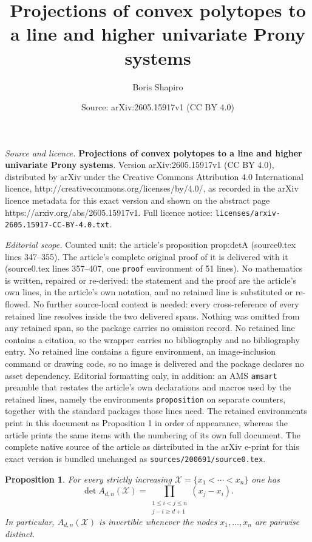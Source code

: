\documentclass[10pt,a4paper]{amsart}
\title{\textbf{Projections of convex polytopes to a line and higher univariate Prony systems}}
\author{Boris Shapiro}
\date{Source: arXiv:2605.15917v1 (CC BY 4.0)}
\newtheorem{proposition}{Proposition}
\newcommand{\cX}{\mathcal{X}}
\begin{document}
\maketitle

\noindent\emph{Source and licence.} \textbf{Projections of convex polytopes to a line and higher univariate Prony systems}. Version arXiv:2605.15917v1 (CC BY 4.0), distributed by arXiv under the Creative Commons Attribution 4.0 International licence, http://creativecommons.org/licenses/by/4.0/, as recorded in the arXiv licence metadata for this exact version and shown on the abstract page https://arxiv.org/abs/2605.15917v1. Full licence notice: \texttt{licenses/arxiv-2605.15917-CC-BY-4.0.txt}.\par\smallskip

\noindent\textit{Editorial scope.} Counted unit: the article's proposition prop:detA (source0.tex lines 347--355). The article's complete original proof of it is delivered with it (source0.tex lines 357--407, one \texttt{proof} environment of 51 lines). No mathematics is written, repaired or re-derived: the statement and the proof are the article's own lines, in the article's own notation, and no retained line is substituted or re-flowed.  No further source-local context is needed: every cross-reference of every retained line resolves inside the two delivered spans.  Nothing was omitted from any retained span, so the package carries no omission record.  No retained line contains a citation, so the wrapper carries no bibliography and no bibliography entry.  No retained line contains a figure environment, an image-inclusion command or drawing code, so no image is delivered and the package declares no asset dependency.  Editorial formatting only, in addition: an AMS \texttt{amsart} preamble that restates the article's own declarations and macros used by the retained lines, namely the environments \texttt{proposition} on separate counters, together with the standard packages those lines need.  The retained environments print in this document as Proposition 1 in order of appearance, whereas the article prints the same items with the numbering of its own full document.  The complete native source of the article as distributed in the arXiv e-print for this exact version is bundled unchanged as \texttt{sources/200691/source0.tex}.
\begin{proposition}\label{prop:detA}
For every strictly increasing $\cX=\{x_1<\cdots<x_n\}$ one has
\[
\det A_{d,n}(\cX)
=
\prod_{\substack{1\le i<j\le n\\ j-i\ge d+1}} (x_j-x_i).
\]
In particular, $A_{d,n}(\cX)$ is invertible whenever the nodes $x_1,\dots,x_n$ are pairwise distinct.
\end{proposition}
\end{document}
